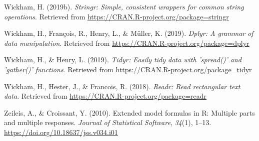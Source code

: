\documentclass[man]{apa6}
\begin{document}
\leavevmode\hypertarget{ref-R-stringr}{}%
Wickham, H. (2019b). \emph{Stringr: Simple, consistent wrappers for common string operations}. Retrieved from \url{https://CRAN.R-project.org/package=stringr}

\leavevmode\hypertarget{ref-R-dplyr}{}%
Wickham, H., François, R., Henry, L., \& Müller, K. (2019). \emph{Dplyr: A grammar of data manipulation}. Retrieved from \url{https://CRAN.R-project.org/package=dplyr}

\leavevmode\hypertarget{ref-R-tidyr}{}%
Wickham, H., \& Henry, L. (2019). \emph{Tidyr: Easily tidy data with 'spread()' and 'gather()' functions}. Retrieved from \url{https://CRAN.R-project.org/package=tidyr}

\leavevmode\hypertarget{ref-R-readr}{}%
Wickham, H., Hester, J., \& Francois, R. (2018). \emph{Readr: Read rectangular text data}. Retrieved from \url{https://CRAN.R-project.org/package=readr}

\leavevmode\hypertarget{ref-R-Formula}{}%
Zeileis, A., \& Croissant, Y. (2010). Extended model formulas in R: Multiple parts and multiple responses. \emph{Journal of Statistical Software}, \emph{34}(1), 1--13. \url{https://doi.org/10.18637/jss.v034.i01}

\endgroup
\end{document}
